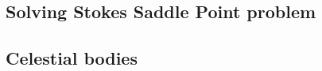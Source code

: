 \subsection{Solving Stokes Saddle Point problem}

\begin{scriptsize}
\cite{laqu86}
\cite{rotf90}
\cite{frha93}
\cite{elgo94}
\cite{cheb96}\cite{elma96}
\cite{brpv97}
\cite{lixu01}
\cite{dogs06}\cite{lica06}
\cite{hoow17}
\end{scriptsize}

\subsection{Celestial bodies}

